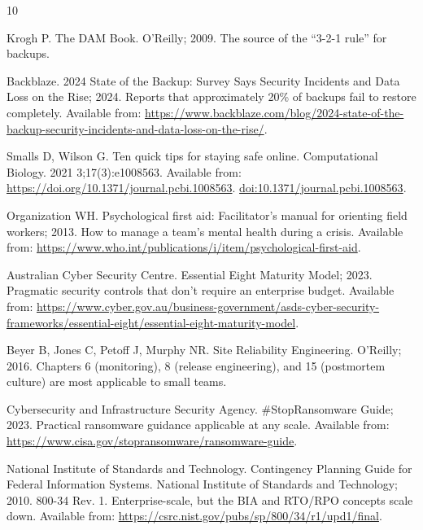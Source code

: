 \documentclass[10pt,letterpaper]{article}
\begin{document}
\begin{thebibliography}{10}

Krogh P.
\newblock The DAM Book.
\newblock O'Reilly; 2009.
\newblock The source of the ``3-2-1 rule'' for backups.

Backblaze. 2024 State of the Backup: Survey Says Security Incidents and Data
  Loss on the Rise; 2024.
\newblock Reports that approximately 20\% of backups fail to restore
  completely.
\newblock Available from:
  \url{https://www.backblaze.com/blog/2024-state-of-the-backup-security-incidents-and-data-loss-on-the-rise/}.

Smalls D, Wilson G.
\newblock Ten quick tips for staying safe online.
 Computational Biology. 2021 3;17(3):e1008563.
\newblock Available from: \url{https://doi.org/10.1371/journal.pcbi.1008563}.
  \href {http://dx.doi.org/10.1371/journal.pcbi.1008563}
  {doi:10.1371/journal.pcbi.1008563}.

Organization WH. Psychological first aid: Facilitator's manual for orienting
  field workers; 2013.
\newblock How to manage a team's mental health during a crisis.
\newblock Available from:
  \url{https://www.who.int/publications/i/item/psychological-first-aid}.

{Australian Cyber Security Centre}. Essential Eight Maturity Model; 2023.
\newblock Pragmatic security controls that don't require an enterprise budget.
\newblock Available from:
  \url{https://www.cyber.gov.au/business-government/asds-cyber-security-frameworks/essential-eight/essential-eight-maturity-model}.

Beyer B, Jones C, Petoff J, Murphy NR.
\newblock Site Reliability Engineering.
\newblock O'Reilly; 2016.
\newblock Chapters 6 (monitoring), 8 (release engineering), and 15 (postmortem
  culture) are most applicable to small teams.

{Cybersecurity and Infrastructure Security Agency}. {\#StopRansomware} Guide;
  2023.
\newblock Practical ransomware guidance applicable at any scale.
\newblock Available from:
  \url{https://www.cisa.gov/stopransomware/ransomware-guide}.

{National Institute of Standards and Technology}.
\newblock Contingency Planning Guide for Federal Information Systems.
\newblock National Institute of Standards and Technology; 2010. 800-34 Rev. 1.
\newblock Enterprise-scale, but the BIA and RTO/RPO concepts scale down.
\newblock Available from:
  \url{https://csrc.nist.gov/pubs/sp/800/34/r1/upd1/final}.


\end{thebibliography}
\end{document}
